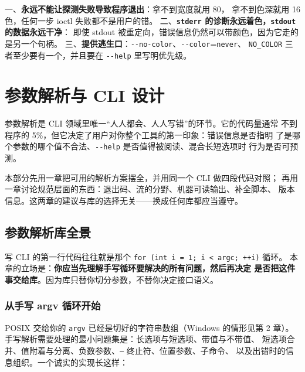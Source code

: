 \documentclass[12pt,a4paper,fontset=fandol]{ctexbook}
\newcommand{\Tp}[1]{\texttt{#1}}
\newcommand{\Opt}[1]{\texttt{-\/-#1}}
\begin{document}
\begin{guideline}[title={探测的三条不可协商底线}]
一、\textbf{永远不能让探测失败导致程序退出}：拿不到宽度就用 80，
拿不到色深就用 16 色，任何一步 ioctl 失败都不是用户的错。
二、\textbf{\Tp{stderr} 的诊断永远着色，\Tp{stdout} 的数据永远干净}：
即使 stdout 被重定向，错误信息仍然可以带颜色，因为它走的是另一个句柄。
三、\textbf{提供逃生口}：\Opt{no-color}、\Opt{color}=\Tp{never}、
\Tp{NO\_COLOR} 三者至少要有一个，并且要在 \Opt{help} 里写明优先级。
\end{guideline}

\part{参数解析与 CLI 设计}

参数解析是 CLI 领域里唯一``人人都会、人人写错''的环节。它的代码量通常
不到程序的 5\%，但它决定了用户对你整个工具的第一印象：错误信息是否指明
了是哪个参数的哪个值不合法、\Opt{help} 是否值得被阅读、混合长短选项时
行为是否可预测。

本部分先用一章把可用的解析方案摆全，并用同一个 CLI 做四段代码对照；
再用一章讨论规范层面的东西：退出码、流的分野、机器可读输出、补全脚本、
版本信息。这两章的建议与库的选择无关——换成任何库都应当遵守。

\chapter{参数解析库全景}

写 CLI 的第一行代码往往就是那个 \Tp{for (int i = 1; i < argc; ++i)} 循环。
本章的立场是：\textbf{你应当先理解手写循环要解决的所有问题，然后再决定
是否把这件事交给库}。因为库只替你切分参数，不替你决定接口语义。

\section{从手写 argv 循环开始}

POSIX 交给你的 \Tp{argv} 已经是切好的字符串数组（Windows 的情形见第 2 章）。
手写解析需要处理的最小问题集是：长选项与短选项、带值与不带值、
短选项合并、值附着与分离、负数参数、\Tp{--} 终止符、位置参数、子命令、
以及出错时的信息组织。一个诚实的实现长这样：
\end{document}

